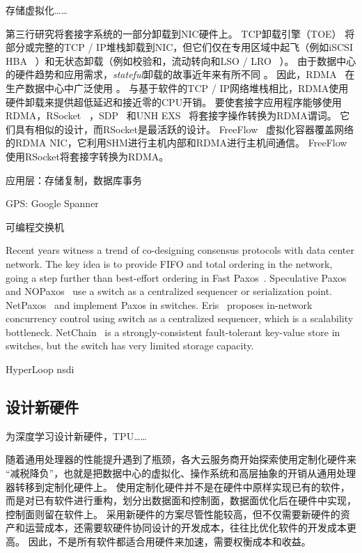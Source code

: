 存储虚拟化……


第三行研究将套接字系统的一部分卸载到NIC硬件上。
TCP卸载引擎（TOE） \cite {tcp-chimney-offload}将部分或完整的TCP / IP堆栈卸载到NIC，但它们仅在专用区域中起飞（例如iSCSI HBA~ \cite {iscsi-hba}）和无状态卸载（例如校验和，流动转向和LSO / LRO~ \cite {lsolro}）。
由于数据中心的硬件趋势和应用需求，\emph {stateful}卸载的故事近年来有所不同 \cite {chuanxiong-rdma-keynote}。
因此，RDMA~ \cite {infiniband2000infiniband}在生产数据中心中广泛使用 \cite {guo2016rdma}。
与基于软件的TCP / IP网络堆栈相比，RDMA使用硬件卸载来提供超低延迟和接近零的CPU开销。
要使套接字应用程序能够使用RDMA，RSocket~ \cite {rsockets}，SDP~ \cite {socketsdirect}和UNH EXS~ \cite {russell2008extended}将套接字操作转换为RDMA谓词。
它们具有相似的设计，而RSocket是最活跃的设计。
FreeFlow~ \cite {nsdi19freeflow}虚拟化容器覆盖网络的RDMA NIC，它利用SHM进行主机内部和RDMA进行主机间通信。
FreeFlow使用RSocket将套接字转换为RDMA。


应用层：存储复制，数据库事务

GPS: Google Spanner

可编程交换机

Recent years witness a trend of co-designing consensus protocols with data center network.
The key idea is to provide FIFO and total ordering in the network, going a step further than best-effort ordering in Fast Paxos~\cite{lamport2006fast,kemme1999processing,moraru2013there,pedone1998optimistic}.
Speculative Paxos~\cite{ports2015designing} and NOPaxos~\cite{li2016just} use a switch as a centralized sequencer or serialization point.
NetPaxos~\cite{dang2015netpaxos,dang2016paxos} and \cite{dang2016network} implement Paxos in switches.
Eris~\cite{eris} proposes in-network concurrency control using switch as a centralized sequencer, which is a scalability bottleneck.
NetChain~\cite{jin2018netchain} is a strongly-consistent fault-tolerant key-value store in switches, but the switch has very limited storage capacity.

HyperLoop nsdi


\subsection{设计新硬件}

为深度学习设计新硬件，TPU……

随着通用处理器的性能提升遇到了瓶颈，各大云服务商开始探索使用定制化硬件来 ``减税降负''，也就是把数据中心的虚拟化、操作系统和高层抽象的开销从通用处理器转移到定制化硬件上。
使用定制化硬件并不是在硬件中原样实现已有的软件，而是对已有软件进行重构，划分出数据面和控制面，数据面优化后在硬件中实现，控制面则留在软件上。
采用新硬件的方案尽管性能较高，但不仅需要新硬件的资产和运营成本，还需要软硬件协同设计的开发成本，往往比优化软件的开发成本更高。
因此，不是所有软件都适合用硬件来加速，需要权衡成本和收益。



